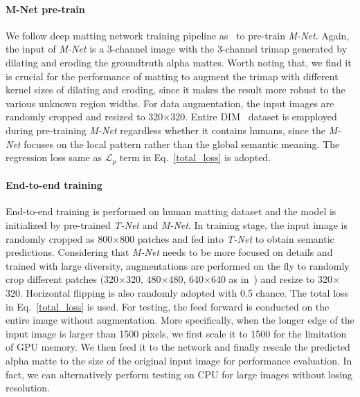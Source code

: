 \paragraph{\textbf{M-Net pre-train}} 
We follow deep matting network training pipeline as~\cite{xu2017deep} to pre-train \emph{M-Net}.
Again, the input of \emph{M-Net} is a 3-channel image with the 3-channel trimap generated by dilating and eroding the groundtruth alpha mattes.
Worth noting that, we find it is crucial for the performance of matting to augment the trimap with different kernel sizes of dilating and eroding, since it makes the result more robust to the various unknown region widths.
For data augmentation, the input images are randomly cropped and resized to 320$\times$320.
Entire DIM~\cite{xu2017deep} dataset is empployed during pre-training \emph{M-Net} regardless whether it contains humans, since the \emph{M-Net} focuses on the local pattern rather than the global semantic meaning.
The regression loss same as $\mathcal{L}_p$ term in Eq.~\ref{total_loss} is adopted.
   


\paragraph{\textbf{End-to-end training}}

End-to-end training is performed on human matting dataset and the model is initialized by pre-trained \emph{T-Net} and \emph{M-Net}.
In training stage, the input image is randomly cropped as 800$\times$800 patches and fed into \emph{T-Net} to obtain semantic predictions.
Considering that \emph{M-Net} needs to be more focused on details and trained with large diversity,
augmentations are performed on the fly to randomly crop different patches (320$\times$320, 480$\times$480, 640$\times$640 as in~\cite{xu2017deep}) and resize to 320$\times$320.
Horizontal flipping is also randomly adopted with 0.5 chance.
The total loss in Eq.~\ref{total_loss} is used.
For testing, the feed forward is conducted on the entire image without augmentation. More specifically, when the longer edge of the input image is larger than 1500 pixels, we first scale it to 1500 for the limitation of GPU memory. We then feed it to the network and finally rescale the predicted alpha matte to the size of the original input image for performance evaluation. In fact, we can alternatively perform testing on CPU for large images without losing resolution.


















